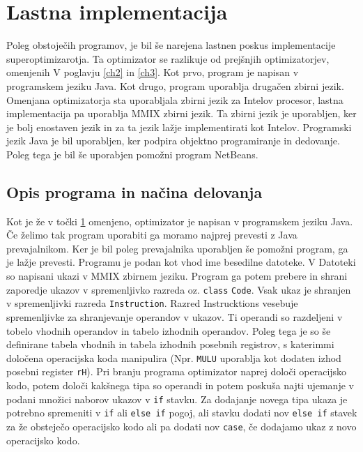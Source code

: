 \documentclass[a4paper, 12pt]{book}
\begin{document}
\chapter{Lastna implementacija}
\label{ch4}
Poleg obstoječih programov, je bil še narejena lastnen poskus implementacije superoptimizarotja. Ta optimizator se razlikuje od prejšnjih optimizatorjev, omenjenih V poglavju \ref{ch2} in \ref{ch3}. Kot prvo, program je napisan v programskem jeziku Java. Kot drugo, program uporablja drugačen zbirni jezik. Omenjana optimizatorja sta uporabljala zbirni jezik za Intelov procesor, lastna implementacija pa uporablja MMIX zbirni jezik. Ta zbirni jezik je uporabljen, ker je bolj enostaven jezik in za ta jezik lažje implementirati kot Intelov. Programski jezik Java je bil uporabljen, ker podpira objektno programiranje in dedovanje. Poleg tega je bil še uporabjen pomožni program NetBeans.

\section{Opis programa in načina delovanja}
\label{prev6}
Kot je že v točki \ref{ch4} omenjeno, optimizator je napisan v programskem jeziku Java. Če želimo tak program uporabiti ga moramo najprej prevesti z Java prevajalnikom. Ker je bil poleg prevajalnika uporabljen še pomožni program, ga je lažje prevesti. Programu je podan kot vhod ime besedilne datoteke. V Datoteki so napisani ukazi v MMIX zbirnem jeziku. Program ga potem prebere in shrani zaporedje ukazov v spremenljivko razreda oz. \texttt{class} \texttt{Code}. Vsak ukaz je shranjen v spremenljivki razreda \texttt{Instruction}. Razred {Instrucktions} vesebuje spremenljivke za shranjevanje operandov v ukazov. Ti operandi so razdeljeni v tobelo vhodnih operandov in tabelo izhodnih operandov. Poleg tega je so še definirane tabela vhodnih in tabela izhodnih posebnih registrov, s katerimmi določena operacijska koda manipulira (Npr. \texttt{MULU} uporablja kot dodaten izhod posebni register \texttt{rH}). Pri branju programa optimizator naprej določi operacijsko kodo, potem določi kakšnega tipa so operandi in potem poskuša najti ujemanje v podani množici naborov ukazov v \texttt{if} stavku. Za dodajanje novega tipa ukaza je potrebno spremeniti v \texttt{if} ali \texttt{else if} pogoj, ali stavku dodati nov \texttt{else if} stavek za že obsteječo operacijsko kodo ali pa dodati nov \texttt{case}, če dodajamo ukaz z novo operacijsko kodo.

\medskip
		
\end{document}

